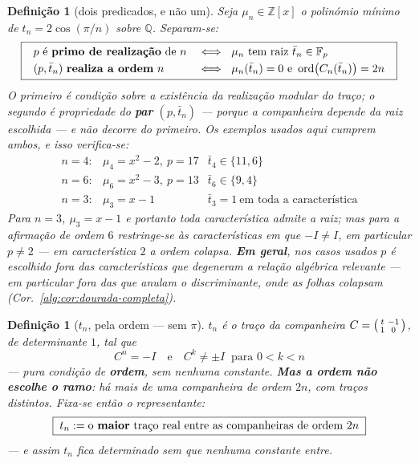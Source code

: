 \documentclass[11pt,a4paper]{article}
\newtheorem{definicao}[teorema]{Definição}
\begin{document}
\begin{definicao}[dois predicados, e não um]\label{def:primo-ordem}
Seja $\mu_n\in\mathbb{Z}[x]$ o polinómio mínimo de $t_n=2\cos(\pi/n)$ sobre
$\mathbb{Q}$. Separam-se:
\[
\boxed{\;
\begin{array}{ll}
p\ \text{é \textbf{primo de realização} de } n
 & \iff\ \mu_n\ \text{tem raiz } \bar t_n\in\mathbb{F}_p\\[3pt]
(p,\bar t_n)\ \text{\textbf{realiza a ordem} } n
 & \iff\ \mu_n(\bar t_n)=0\ \text{e}\ \operatorname{ord}\bigl(C_n(\bar t_n)\bigr)=2n
\end{array}\;}
\]
O primeiro é condição sobre a \emph{existência} da realização modular do traço; o
segundo é propriedade do \textbf{par} $(p,\bar t_n)$ --- porque a companheira depende
da raiz escolhida --- e não decorre do primeiro. Os exemplos usados aqui cumprem ambos, e isso verifica-se:
\[
\begin{array}{lll}
n=4: & \mu_4=x^{2}-2,\ p=17 & \bar t_4\in\{11,6\}\\
n=6: & \mu_6=x^{2}-3,\ p=13 & \bar t_6\in\{9,4\}\\
n=3: & \mu_3=x-1 & \bar t_3=1\ \text{em toda a característica}
\end{array}
\]
Para $n=3$, $\mu_3=x-1$ e portanto \emph{toda} característica admite a raiz; mas
para a afirmação de ordem $6$ restringe-se às características em que $-I\neq I$,
em particular $p\neq2$ --- em característica $2$ a ordem colapsa. \textbf{Em geral},
nos casos usados $p$ é escolhido \emph{fora das características que degeneram a
relação algébrica relevante} --- em particular fora das que anulam o discriminante,
onde as folhas colapsam (Cor.~\ref{alg:cor:dourada-completa}).
\end{definicao}

\begin{definicao}[$t_n$, pela ordem --- sem $\pi$]\label{def:tn}
$t_n$ é o traço da companheira
$C=\begin{psmallmatrix}t&-1\\1&0\end{psmallmatrix}$, de determinante $1$, tal que
\[
\boxed{\;C^{n}=-I\quad\text{e}\quad C^{k}\neq\pm I\ \text{ para } 0<k<n\;}
\]
--- pura condição de \textbf{ordem}, sem nenhuma constante. \textbf{Mas a ordem
não escolhe o ramo}: há mais de uma companheira de ordem $2n$, com traços
distintos. Fixa-se então o representante:
\[
\boxed{\;t_n:=\text{o \textbf{maior} traço real entre as companheiras de ordem }2n\;}
\]
--- e assim $t_n$ fica determinado sem que nenhuma constante entre.
\end{definicao}
\end{document}
